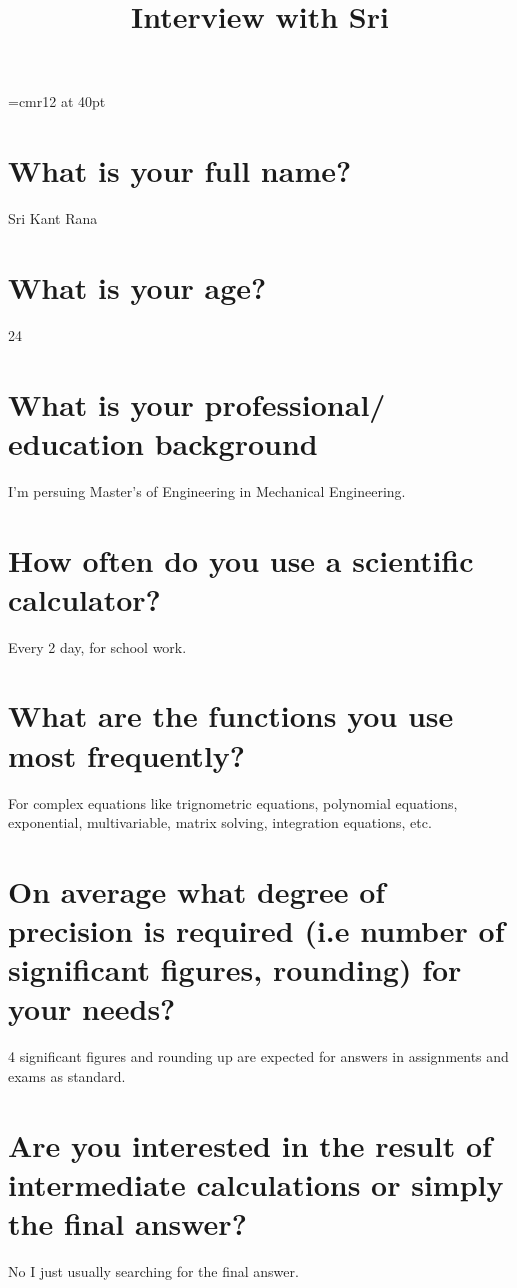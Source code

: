 \documentclass{article}
\begin{document}
\font\myfont=cmr12 at 40pt
\date{}
\title{\textbf{\myfont Interview with Sri}}
\raggedright
\maketitle


\section*{\large {What is your full name?}}
Sri Kant Rana

\section*{\large{What is your age?}}
24

\section*{\large{What is your professional/ education background}}
I'm persuing Master's of Engineering in Mechanical Engineering.

\section*{\large{How often do you use a scientific calculator?}}
Every 2 day, for school work.

\section*{\large{What are the functions you use most frequently?}}
For complex equations like trignometric equations, polynomial equations, exponential,
multivariable, matrix solving, integration equations, etc.

\section*{\large{On average what degree of precision is required (i.e number of significant figures, rounding)
for your needs?}}
4 significant figures and rounding up are expected for answers in assignments and exams as
standard.

\section*{\large{Are you interested in the result of intermediate calculations or simply the final answer?}}
No I just usually searching for the final answer.
\end{document}
